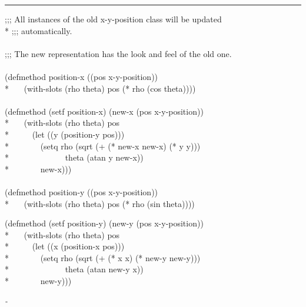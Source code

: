 \begin{defun}
\hrule width 0pt\relax
\begin{lisp}
;;; All instances of the old x-y-position class will be updated \\*
;;; automatically. \\
\\
;;; The new representation has the look and feel of the old one. \\
\\
(defmethod position-x ((pos x-y-position)) \\*
~~~(with-slots (rho theta) pos (* rho (cos theta)))) \\
\\
(defmethod (setf position-x) (new-x (pos x-y-position)) \\*
~~~(with-slots (rho theta) pos \\*
~~~~~(let ((y (position-y pos))) \\*
~~~~~~~(setq rho (sqrt (+ (* new-x new-x) (* y y))) \\*
~~~~~~~~~~~~~theta (atan y new-x)) \\*
~~~~~~~new-x))) \\
\\
(defmethod position-y ((pos x-y-position)) \\*
~~~(with-slots (rho theta) pos (* rho (sin theta))))
\end{lisp}
\begin{lisp}
(defmethod (setf position-y) (new-y (pos x-y-position)) \\*
~~~(with-slots (rho theta) pos \\*
~~~~~(let ((x (position-x pos))) \\*
~~~~~~~(setq rho (sqrt (+ (* x x) (* new-y new-y))) \\*
~~~~~~~~~~~~~theta (atan new-y x)) \\*
~~~~~~~new-y)))
\end{lisp}
\end{defun}

\newbox\hyphbox
\setbox\hyphbox\hbox\emph{-}
\def\foohyphen{\copy\hyphbox}

